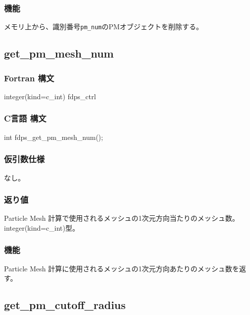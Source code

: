 \subsubsection*{機能}
メモリ上から、識別番号\texttt{pm\_num}のPMオブジェクトを削除する。
\clearpage

\subsection{get\_pm\_mesh\_num}
\subsubsection*{Fortran 構文}
\begin{screen}
\begin{spverbatim}
integer(kind=c_int) fdps_ctrl%
\end{spverbatim}
\end{screen}

\subsubsection*{C言語 構文}
\begin{screen}
\begin{spverbatim}
int fdps_get_pm_mesh_num();
\end{spverbatim}
\end{screen}

\subsubsection*{仮引数仕様}
なし。

\subsubsection*{返り値}
Particle Mesh 計算で使用されるメッシュの1次元方向当たりのメッシュ数。integer(kind=c\_int)型。

\subsubsection*{機能}
Particle Mesh 計算に使用されるメッシュの1次元方向あたりのメッシュ数を返す。
\clearpage

\subsection{get\_pm\_cutoff\_radius}

